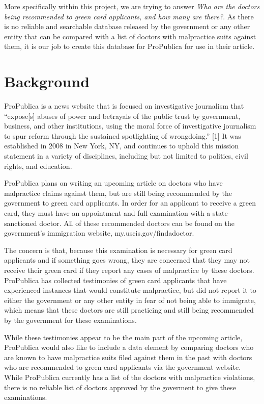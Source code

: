 \documentclass[10pt,letterpaper]{article}
\begin{document}
More specifically within this project, we are trying to answer \emph{Who
are the doctors being recommended to green card applicants, and how many
are there?}. As there is no reliable and searchable database released by
the government or any other entity that can be compared with a list of
doctors with malpractice suits against them, it is our job to create
this database for ProPublica for use in their article.

\section{Background}\label{background}

ProPublica is a news website that is focused on investigative journalism
that ``expose{[}s{]} abuses of power and betrayals of the public trust
by government, business, and other institutions, using the moral force
of investigative journalism to spur reform through the sustained
spotlighting of wrongdoing.'' {[}1{]} It was established in 2008 in New
York, NY, and continues to uphold this mission statement in a variety of
disciplines, including but not limited to politics, civil rights, and
education.

ProPublica plans on writing an upcoming article on doctors who have
malpractice claims against them, but are still being recommended by the
government to green card applicants. In order for an applicant to
receive a green card, they must have an appointment and full examination
with a state-sanctioned doctor. All of these recommended doctors can be
found on the government's immigration website, my.uscis.gov/findadoctor.

The concern is that, because this examination is necessary for green
card applicants and if something goes wrong, they are concerned that
they may not receive their green card if they report any cases of
malpractice by these doctors. ProPublica has collected testimonies of
green card applicants that have experienced instances that would
constitute malpractice, but did not report it to either the government
or any other entity in fear of not being able to immigrate, which means
that these doctors are still practicing and still being recommended by
the government for these examinations.

While these testimonies appear to be the main part of the upcoming
article, ProPublica would also like to include a data element by
comparing doctors who are known to have malpractice suits filed against
them in the past with doctors who are recommended to green card
applicants via the government website. While ProPublica currently has a
list of the doctors with malpractice violations, there is no reliable
list of doctors approved by the goverment to give these examinations.
\end{document}
